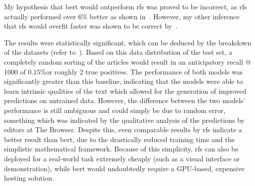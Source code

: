My hypothesis that \acrshort{bert} would outperform \acrshort{rfs} was proved to be incorrect, as \acrshort{rfs} actually performed over $6\%$ better as shown in~. However, my other inference that \acrlong{rfs} would overfit faster was shown to be correct by~.

The results were statistically significant, which can be deduced by the breakdown of the datasets (refer to~). Based on this data distribution of the test set, a completely random sorting of the articles would result in an anticipatory recall @ 1000 of $0.15\%$or roughly 2 true positives. The performance of both models was significantly greater than this baseline, indicating that the models were able to learn intrinsic qualities of the text which allowed for the generation of improved predictions on untrained data. However, the difference between the two models' performance is still ambiguous and could simply be due to random error, something which was indicated by the qualitative analysis of the predictions by editors at The Browser. Despite this, even comparable results by \acrshort{rfs} indicate a better result than \acrshort{bert}, due to the drastically reduced training time and the simplistic mathematical framework. Because of this simplicity, \acrshort{rfs} can also be deployed for a real-world task extremely cheaply (such as a visual interface or demonstration), while \acrshort{bert} would undoubtedly require a GPU-based, expensive hosting solution.

